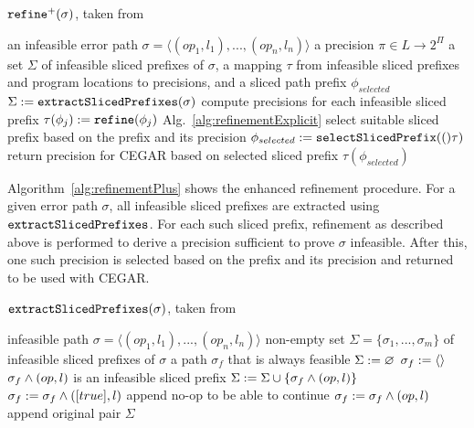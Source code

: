 \begin{algorithm}[t]
\caption{${\texttt{refine}^{+}}(\sigma)$, taken from \cite{Beyer2015}}
\label{alg:refinementPlus}
\begin{algorithmic}
\Input an infeasible error path $\sigma = \langle (op_1, l_1), ..., (op_n, l_n) \rangle$
\Output a precision $\pi \in L \rightarrow 2^\Pi$
\Variables a set $\Sigma$ of infeasible sliced prefixes of $\sigma$,
           a mapping $\tau$ from infeasible sliced prefixes and program locations to precisions, and
           a sliced path prefix $\phi_{selected}$
\State $\Sigma := \texttt{extractSlicedPrefixes}(\sigma)$
\Comment compute precisions for each infeasible sliced prefix
  \State $\tau(\phi_j) := \texttt{refine}(\phi_j)$ \Comment Alg.~\ref{alg:refinementExplicit}
\EndFor
\Comment select suitable sliced prefix based on the prefix and its precision
\State $\phi_{selected} := \texttt{selectSlicedPrefix}(()\tau)$
\Comment return precision for CEGAR based on selected sliced prefix
\Return $\tau(\phi_{selected})$
\end{algorithmic}
\end{algorithm}

Algorithm~\ref{alg:refinementPlus} shows the enhanced refinement procedure.
For a given error path $\sigma$, all infeasible sliced prefixes are extracted using $\texttt{extractSlicedPrefixes}$.
For each such sliced prefix, refinement as described above is performed to derive a precision sufficient to prove $\sigma$ infeasible.
After this, one such precision is selected based on the prefix and its precision and returned to be used with CEGAR.

\begin{algorithm}[t]
\caption{$\texttt{extractSlicedPrefixes}(\sigma)$, taken from \cite{Beyer2015}}
\label{alg:extractPrefixes}
\begin{algorithmic}
\Input infeasible path $\sigma = \langle (op_1, l_1), ..., (op_n, l_n) \rangle$
\Output non-empty set $\Sigma = \{\sigma_1, ..., \sigma_m \}$ of infeasible sliced prefixes of $\sigma$
\Variables a path $\sigma_f$ that is always feasible
\State $\Sigma := \varnothing$
\State $\sigma_f := \langle \rangle$
    \Comment $\sigma_f \wedge (op, l)$ is an infeasible sliced prefix
    \State $\Sigma := \Sigma \cup \{ \sigma_f \wedge (op, l) \}$
    \State $\sigma_f := \sigma_f \wedge ([true], l)$ \Comment append no-op to be able to continue
  \Else
    \State $\sigma_f := \sigma_f \wedge (op, l)$ \Comment append original pair
  \EndIf
\EndFor
\Return $\Sigma$
\end{algorithmic}
\end{algorithm}

